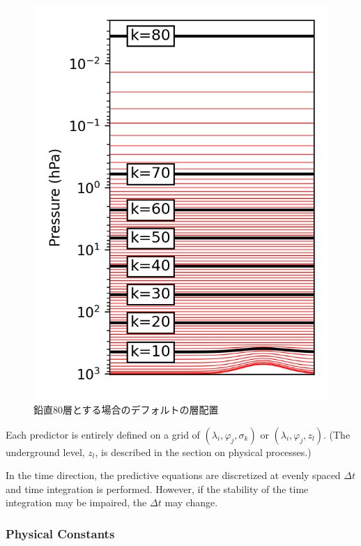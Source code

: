 \begin{figure}
\centering
\includegraphics{levels.png}
\caption{鉛直80層とする場合のデフォルトの層配置}
\end{figure}

Each predictor is entirely defined on a grid of
\((\lambda_i, \varphi_j, \sigma_k)\) or \((\lambda_i, \varphi_j, z_l)\).
(The underground level, \(z_l\), is described in the section on physical
processes.)

In the time direction, the predictive equations are discretized at
evenly spaced \(\Delta t\) and time integration is performed. However,
if the stability of the time integration may be impaired, the
\(\Delta t\) may change.

\hypertarget{physical-constants}{%
\subsubsection{Physical Constants}\label{physical-constants}}

